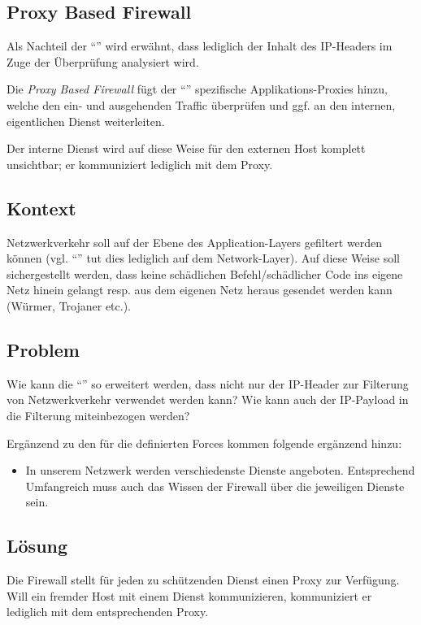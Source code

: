 \subsection{Proxy Based Firewall}
\label{sec:proxy-based-firewall}

Als Nachteil der ``'' wird erwähnt, dass lediglich der Inhalt des IP-Headers im Zuge der Überprüfung analysiert wird.

Die \emph{Proxy Based Firewall} fügt der ``'' spezifische Applikations-Proxies hinzu, welche den ein- und ausgehenden Traffic überprüfen und ggf. an den internen, eigentlichen Dienst weiterleiten.

Der interne Dienst wird auf diese Weise für den externen Host  komplett unsichtbar; er kommuniziert lediglich mit dem Proxy.


\subsection*{Kontext}
Netzwerkverkehr soll auf der Ebene des Application-Layers gefiltert werden können (vgl. ``'' tut dies lediglich auf dem Network-Layer). Auf diese Weise soll sichergestellt werden, dass keine schädlichen Befehl/schädlicher Code ins eigene Netz hinein gelangt resp. aus dem eigenen Netz heraus gesendet werden kann (Würmer, Trojaner etc.).

\subsection*{Problem}
Wie kann die ``'' so erweitert werden, dass nicht nur der IP-Header zur Filterung von Netzwerkverkehr verwendet werden kann? Wie kann auch der IP-Payload in die Filterung miteinbezogen werden?

Ergänzend zu den für die  definierten Forces kommen folgende ergänzend hinzu:

\begin{itemize}
	\item In unserem Netzwerk werden verschiedenste Dienste angeboten. Entsprechend Umfangreich muss auch das Wissen der Firewall über die jeweiligen Dienste sein.
\end{itemize}


\subsection*{Lösung}
Die Firewall stellt für jeden zu schützenden Dienst einen Proxy zur Verfügung. Will ein fremder Host mit einem Dienst kommunizieren, kommuniziert er lediglich mit dem entsprechenden Proxy.

